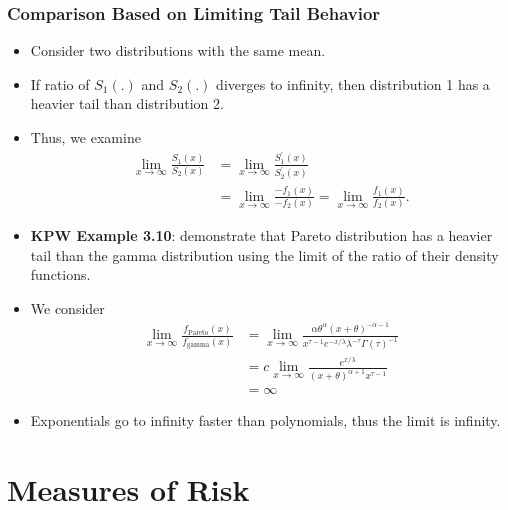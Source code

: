 \documentclass[]{book}
\theoremstyle{definition}
\theoremstyle{definition}
\theoremstyle{definition}
\theoremstyle{remark}
\begin{document}
\subsubsection{Comparison Based on Limiting Tail
Behavior}\label{comparison-based-on-limiting-tail-behavior}

\begin{itemize}
\item
  Consider two distributions with the same mean.
\item
  If ratio of \(S_1(.)\) and \(S_2(.)\) diverges to infinity, then
  distribution 1 has a heavier tail than distribution 2.
\item
  Thus, we examine \[\begin{aligned}
  \lim_{x\to \infty} \frac{S_1(x)}{S_2(x)} &= \lim_{x \to \infty} \frac{S_1^{'}(x)}{S_2^{'}(x)} \\
  &= \lim_{x \to \infty} \frac{-f_1(x)}{-f_2(x)} = \lim_{x\to \infty} \frac{f_1(x)}{f_2(x)}.\end{aligned}\]
\item
  \textbf{KPW Example 3.10}: demonstrate that Pareto distribution has a
  heavier tail than the gamma distribution using the limit of the ratio
  of their density functions.
\item
  We consider \[\begin{aligned}
  \lim_{x\to \infty} \frac{f_{\text{Pareto}}(x)}{f_{\text{gamma}}(x)} &= \lim_{x \to \infty} \frac{\alpha \theta^{\alpha} (x+ \theta)^{-\alpha-1}}{x^{\tau-1} e^{-x/\lambda} \lambda^{-\tau} \Gamma(\tau)^{-1}} \\
  &= c \lim_{x\to \infty} \frac{e^{x/\lambda}}{(x+\theta)^{\alpha+1} x^{\tau-1}} \\
  &= \infty\end{aligned}\]
\item
  Exponentials go to infinity faster than polynomials, thus the limit is
  infinity.
\end{itemize}

\section{Measures of Risk}\label{measures-of-risk}
\end{document}
